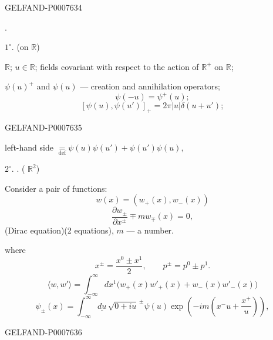 \begin{GelfandAdjacentEvidence}{GELFAND-P000763}{4}


.

\(1^\circ\).  (on \(\mathbb R\))

 \(\mathbb R\); \(u\in\mathbb R\); fields covariant with respect to the action of \(\mathbb R^+\) on \(\mathbb R\);

\(\psi(u)^+\) and \(\psi(u)\) --- creation and annihilation operators;
\begin{equation*}
\tag{1}
\psi(-u)=\psi^+(u);
\end{equation*}
\begin{equation*}
\tag{2}
[\psi(u),\psi(u')]_+=2\pi|u|\delta(u+u');
\end{equation*}
\end{GelfandAdjacentEvidence}
\begin{GelfandAdjacentEvidence}{GELFAND-P000763}{5}


left-hand side \(\underset{\mathrm{def}}{=}\psi(u)\psi(u')+\psi(u')\psi(u),\)

\(2^\circ\). . ( \(\mathbb R^2\))

Consider a pair of functions:
\[
w(x)=(w_+(x),w_-(x))
\]
\begin{equation*}
\tag{3}
\frac{\partial w_\pm}{\partial x^\pm}\mp m w_\mp(x)=0,
\end{equation*}
(Dirac equation)\qquad (2 equations), \(m\) --- a number.

where
\[
x^\pm=\frac{x^0\pm x^1}{2},\qquad p^\pm=p^0\pm p^1.
\]
\begin{equation*}
\tag{4}
\langle w,w'\rangle=\int_{-\infty}^{\infty}dx^1
\bigl(w_+(x)w'_+(x)+w_-(x)w'_-(x)\bigr)
\end{equation*}
\begin{equation*}
\tag{5}
\psi_\pm(x)=\int_{-\infty}^{\infty}\underline{du}\,
\sqrt{0+iu}^{\,\pm}\psi(u)
\exp\!\left(-im\left(x^-u+\frac{x^+}{u}\right)\right),
\end{equation*}
\end{GelfandAdjacentEvidence}
\begin{GelfandAdjacentEvidence}{GELFAND-P000763}{6}


\end{GelfandAdjacentEvidence}


